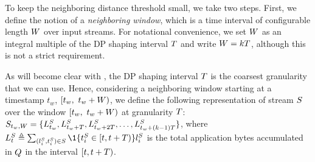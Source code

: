 To keep the neighboring distance threshold small, we take two steps.
First, we define the notion of a {\em neighboring window}, which is a time
interval of configurable length $W$ over input streams.
For notational convenience, we set $W$ as an integral multiple of the DP
shaping interval $T$ and write
$W = k T$, although this is not a strict requirement.

As will become clear with , the DP shaping
interval $T$ is the coarsest granularity that we can use.
Hence, considering a neighboring window starting at a timestamp $t_w$, \ie
$[t_w,~t_w + W)$,
we define the following representation of stream $S$ over the window
$[t_w,~t_w +W)$ at granularity $T$: $S_{t_w, W} = \{L^S_{t_w},
L^S_{t_w+T}, L^S_{t_w+2T}, \ldots, L^S_{t_w+(k-1)T}\}$,
where $L^S_{t} \triangleq \sum_{(l^S_i, t^S_i) \in S} \1\{t^S_i \in [t,
t+\dpintvl)\} l^{\istream}_i$ is the total application bytes accumulated in
$Q$ in the interval $[t, t+T)$.

